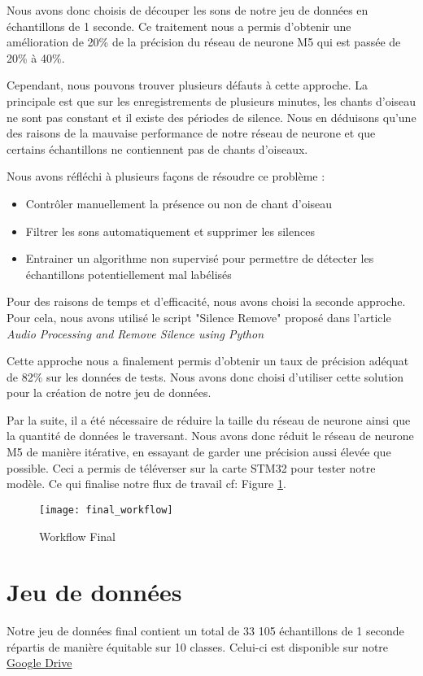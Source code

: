 Nous avons donc choisis de découper les sons de notre jeu de données en échantillons de 1 seconde.
Ce traitement nous a permis d'obtenir une amélioration de 20\% de la précision 
du réseau de neurone M5 qui est passée de 20\% à 40\%. 

Cependant, nous pouvons trouver plusieurs défauts à cette approche. La principale est que sur les enregistrements de plusieurs minutes,
les chants d'oiseau ne sont pas constant et il existe des périodes de silence. 
Nous en déduisons qu'une des raisons de la mauvaise performance de notre réseau de neurone 
et que certains échantillons ne contiennent pas de chants d'oiseaux. 

\pagebreak
Nous avons réfléchi à plusieurs façons de résoudre ce problème : 
\begin{itemize}
  \item Contrôler manuellement la présence ou non de chant d'oiseau 
  \item Filtrer les sons automatiquement et supprimer les silences
  \item Entrainer un algorithme non supervisé pour permettre de détecter les échantillons potentiellement mal labélisés
\end{itemize}

Pour des raisons de temps et d'efficacité, nous avons choisi la seconde approche. Pour cela, nous avons
utilisé le script "Silence Remove" proposé dans l'article \emph{Audio Processing and Remove Silence using Python} \cite{DataCleaning}

 
Cette approche nous a finalement permis d'obtenir un taux de précision adéquat de 82\% sur les données de tests.
Nous avons donc choisi d'utiliser cette solution pour la création de notre jeu de données.

Par la suite, il a été nécessaire de réduire la taille du réseau de neurone ainsi que la quantité de données le traversant.
Nous avons donc réduit le réseau de neurone M5 de manière itérative, en essayant de garder une précision aussi élevée que possible.
Ceci a permis de téléverser sur la carte STM32 pour tester notre modèle.
Ce qui finalise notre flux de travail cf: Figure \ref{graph:final_workflow}.

\begin{figure}[!ht]
  \texttt{[image: final\_workflow]}
  \centering
  \caption{Workflow Final}
  \label{graph:final_workflow}
\end{figure}


\section{Jeu de données}
Notre jeu de données final contient un total de 33 105 échantillons de 1 seconde 
répartis de manière équitable sur 10 classes. 
Celui-ci est disponible sur notre \href{https://drive.google.com/file/d/1zVLOBS-vfTlgu_EdVVaLhvU9dm-XX1qR/view?usp=sharing}{Google Drive}\cite{Dataset}

